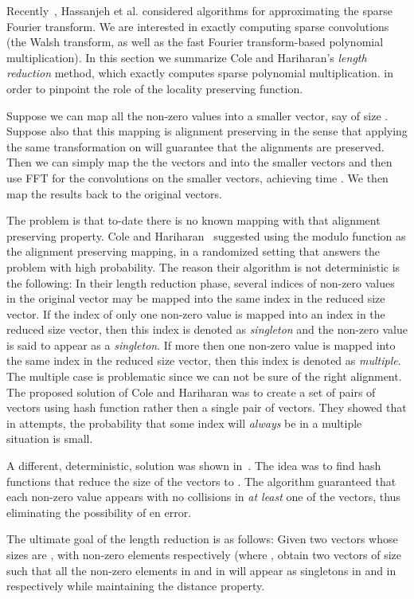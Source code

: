 \documentclass[11pt,amssymb]{article}
\begin{document}
Recently~\cite{hikpa:12,hikpb:12}, Hassanjeh et
al. considered algorithms for approximating the sparse Fourier
transform. We are interested in exactly computing sparse convolutions 
(the Walsh transform, as well as the fast Fourier transform-based
polynomial multiplication). In this section we summarize Cole and
Hariharan's {\em length reduction} method, which exactly computes
sparse polynomial multiplication. in order to pinpoint the role of the
locality preserving function. 

Suppose we can map all the non-zero values into a smaller vector, say
of size . Suppose also that this mapping is alignment
preserving in the sense that applying the same transformation on 
will guarantee that the alignments are preserved. Then we can simply
map the the vectors  and  into the smaller vectors and then
use FFT for the convolutions on the smaller vectors, achieving time
. We then map the results back to the original vectors.

The problem is that to-date there is no known mapping with that
alignment preserving property. Cole and Hariharan~\cite{CH:02}
suggested using the modulo function as the alignment preserving
mapping, in a randomized setting that answers the problem with high
probability. The reason their algorithm is not deterministic is the
following:
In their length reduction phase, several indices of
non-zero values in the original vector may be mapped into the same
index in the reduced size vector. If the index of only one non-zero
value is mapped into an index in the reduced size vector, then this
index is denoted as {\it singleton} and the non-zero value is said
to appear as a {\it singleton}. If more then one non-zero value is
mapped into the same index in the reduced size vector, then this
index is denoted as {\it multiple}. The multiple case is problematic
since we can not be sure of the right alignment. The proposed solution
of Cole and Hariharan was to create a set of  pairs of vectors
using  hash function rather then a single pair of vectors.
They showed that in  attempts, the probability that some
index will {\em always} be in a multiple situation is small.

A different, deterministic, solution was shown in~\cite{LR07}. The
idea was to find  hash functions that reduce the size of the
vectors to . The algorithm guaranteed that each
non-zero value appears with no collisions in {\em at least} one of the
vectors, thus eliminating the possibility of en error.

The ultimate goal of the length reduction is as follows: Given two
vectors  whose sizes are , with  non-zero
elements respectively (where , obtain two vectors
 of size  such that all the non-zero elements in  and 
in  will appear as singletons in  and in 
respectively while maintaining the distance property.
\end{document}
